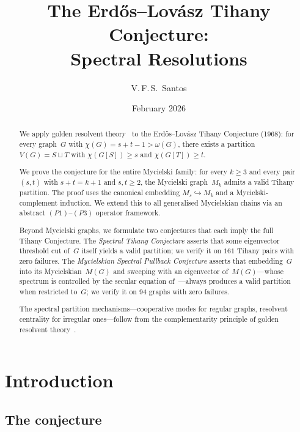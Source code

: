 \documentclass[11pt]{amsart}
\title[The Tihany Conjecture: Spectral Resolutions]{%
The Erd\H{o}s--Lov\'asz Tihany Conjecture:\\
Spectral Resolutions}
\author{V.\,F.\,S.~Santos}
\date{February 2026}
\theoremstyle{definition}
\theoremstyle{remark}
\begin{document}
\begin{abstract}
We apply golden resolvent theory~\cite{santos-grt-2026} to the 
Erd\H{o}s--Lov\'asz Tihany Conjecture (1968): for every graph~$G$ 
with $\chi(G) = s + t - 1 > \omega(G)$, there exists a partition 
$V(G) = S \sqcup T$ with $\chi(G[S]) \ge s$ and $\chi(G[T]) \ge t$.

We prove the conjecture for the entire Mycielski family: for every 
$k \ge 3$ and every pair $(s,t)$ with $s + t = k + 1$ and $s, t \ge 2$, 
the Mycielski graph~$M_k$ admits a valid Tihany partition.  The proof 
uses the canonical embedding $M_s \hookrightarrow M_k$ and a 
Mycielski-complement induction.  We extend this to all generalised 
Mycielskian chains via an abstract $(P1)$--$(P3)$ operator framework.

Beyond Mycielski graphs, we formulate two conjectures that each imply 
the full Tihany Conjecture.  The \emph{Spectral Tihany Conjecture} 
asserts that some eigenvector threshold cut of~$G$ itself yields a 
valid partition; we verify it on $161$ Tihany pairs with zero failures.  
The \emph{Mycielskian Spectral Pullback Conjecture} asserts that 
embedding~$G$ into its Mycielskian~$M(G)$ and sweeping with an 
eigenvector of~$M(G)$---whose spectrum is controlled by the secular 
equation of~\cite{santos-grt-2026}---always produces a valid partition 
when restricted to~$G$; we verify it on $94$ graphs with zero failures.

The spectral partition mechanisms---cooperative modes for 
regular graphs, resolvent centrality for irregular ones---follow from 
the complementarity principle of golden resolvent 
theory~\cite{santos-grt-2026}.
\end{abstract}

\maketitle


\section{Introduction}\label{sec:intro}

\subsection{The conjecture}
\end{document}
